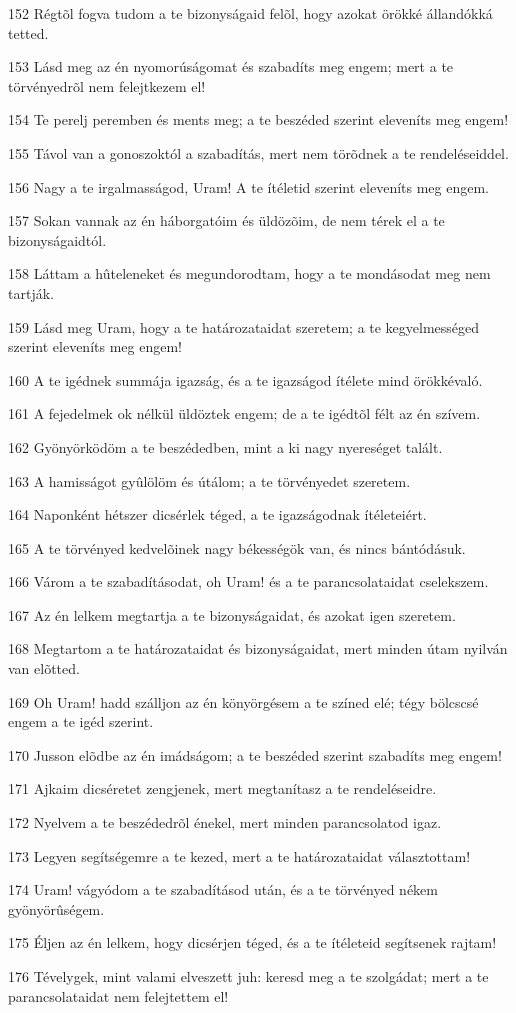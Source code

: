 \par 152 Régtõl fogva tudom a te bizonyságaid felõl, hogy azokat örökké állandókká tetted.
\par 153 Lásd meg az én nyomorúságomat és szabadíts meg engem; mert a te törvényedrõl nem felejtkezem el!
\par 154 Te perelj peremben és ments meg; a te beszéded szerint eleveníts meg engem!
\par 155 Távol van a gonoszoktól a szabadítás, mert nem törõdnek a te rendeléseiddel.
\par 156 Nagy a te irgalmasságod, Uram! A te ítéletid szerint eleveníts meg engem.
\par 157 Sokan vannak az én háborgatóim és üldözõim, de nem térek el a te bizonyságaidtól.
\par 158 Láttam a hûteleneket és megundorodtam, hogy a te mondásodat meg nem tartják.
\par 159 Lásd meg Uram, hogy a te határozataidat szeretem; a te kegyelmességed szerint eleveníts meg engem!
\par 160 A te igédnek summája igazság, és a te igazságod ítélete mind örökkévaló.
\par 161 A fejedelmek ok nélkül üldöztek engem; de a te igédtõl félt az én szívem.
\par 162 Gyönyörködöm a te beszédedben, mint a ki nagy nyereséget talált.
\par 163 A hamisságot gyûlölöm és útálom; a te törvényedet szeretem.
\par 164 Naponként hétszer dicsérlek téged, a te igazságodnak ítéleteiért.
\par 165 A te törvényed kedvelõinek nagy békességök van, és nincs bántódásuk.
\par 166 Várom a te szabadításodat, oh Uram! és a te parancsolataidat cselekszem.
\par 167 Az én lelkem megtartja a te bizonyságaidat, és azokat igen szeretem.
\par 168 Megtartom a te határozataidat és bizonyságaidat, mert minden útam nyilván van elõtted.
\par 169 Oh Uram! hadd szálljon az én könyörgésem a te színed elé; tégy bölcscsé engem a te igéd szerint.
\par 170 Jusson elõdbe az én imádságom; a te beszéded szerint szabadíts meg engem!
\par 171 Ajkaim dicséretet zengjenek, mert megtanítasz a te rendeléseidre.
\par 172 Nyelvem a te beszédedrõl énekel, mert minden parancsolatod igaz.
\par 173 Legyen segítségemre a te kezed, mert a te határozataidat választottam!
\par 174 Uram! vágyódom a te szabadításod után, és a te törvényed nékem gyönyörûségem.
\par 175 Éljen az én lelkem, hogy dicsérjen téged, és a te ítéleteid segítsenek rajtam!
\par 176 Tévelygek, mint valami elveszett juh: keresd meg a te szolgádat; mert a te parancsolataidat nem felejtettem el!


